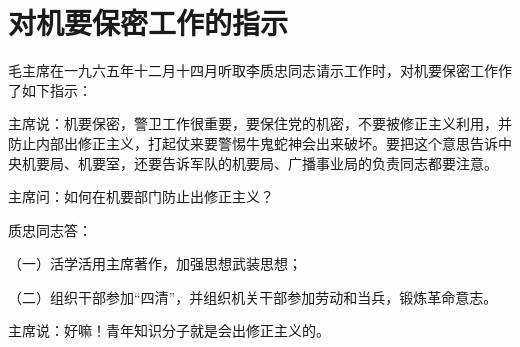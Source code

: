 \section[对机要保密工作的指示（一九六五年十二月十四日）]{对机要保密工作的指示}


毛主席在一九六五年十二月十四月听取李质忠同志请示工作时，对机要保密工作作了如下指示：

主席说：机要保密，警卫工作很重要，要保住党的机密，不要被修正主义利用，并防止内部出修正主义，打起仗来要警惕牛鬼蛇神会出来破坏。要把这个意思告诉中央机要局、机要室，还要告诉军队的机要局、广播事业局的负责同志都要注意。

主席问：如何在机要部门防止出修正主义？

质忠同志答：

（一）活学活用主席著作，加强思想武装思想；

（二）组织干部参加“四清”，并组织机关干部参加劳动和当兵，锻炼革命意志。

主席说：好嘛！青年知识分子就是会出修正主义的。


